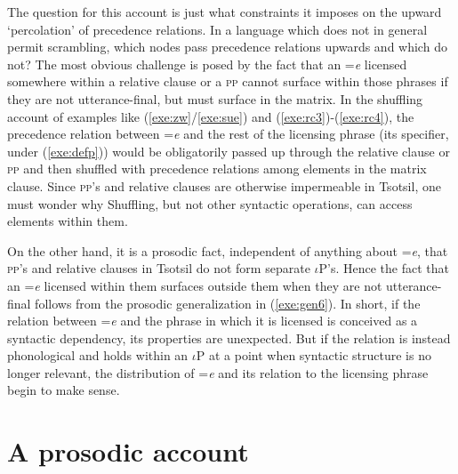 \documentclass[output=paper,
modfonts
]{LSP/langsci}
\begin{document}
The question for this account is just what constraints it imposes on the upward `percolation' of 
precedence relations. In a language which does not in general permit scrambling, which nodes pass precedence relations upwards and which do not?
The most obvious challenge is posed by the fact that an =\emph{e} licensed somewhere within a relative clause or a \textsc{pp} cannot surface
within those phrases if they are not utterance-final, but must surface in the matrix.  
In the shuffling account of examples like (\ref{exe:zw}/\ref{exe:sue}) and (\ref{exe:rc3})-(\ref{exe:rc4}),
 the precedence relation between =\emph{e} and the rest of the licensing phrase (its specifier, under (\ref{exe:defp})) would be obligatorily
passed up through the relative clause or \textsc{pp} and then shuffled with precedence relations among elements  in the matrix clause. 
Since \textsc{pp}'s and relative clauses are otherwise impermeable in Tsotsil, one must 
 wonder why Shuffling, but not other syntactic operations, can access elements within them. 
 
 On the other hand, it is a prosodic fact, independent of anything about =\emph{e}, that \textsc{pp}'s and relative clauses in 
 Tsotsil do not form separate $\iota$P's. Hence the fact that  an =\emph{e} licensed within them surfaces outside them when they
 are not utterance-final follows from the prosodic generalization in (\ref{exe:gen6}).  
 In short, if the relation between =\emph{e} and the phrase in which it is licensed is conceived as a syntactic dependency, 
 its properties are unexpected. 
But if the relation is instead phonological and holds 
 within an $\iota$P at a point when syntactic structure is no longer relevant, the distribution of =\emph{e} and
its relation to the licensing phrase begin to make sense.

\section{A prosodic account}
\end{document}
